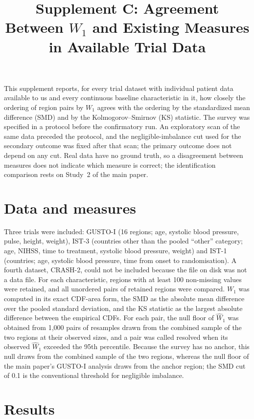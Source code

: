 \documentclass[11pt]{article}
\title{Supplement C: Agreement Between $W_1$ and Existing Measures in Available Trial Data}
\date{}
\begin{document}
\maketitle

This supplement reports, for every trial dataset with individual patient data available to us and every continuous baseline characteristic in it, how closely the ordering of region pairs by $W_1$ agrees with the ordering by the standardized mean difference (SMD) and by the Kolmogorov--Smirnov (KS) statistic. The survey was specified in a protocol before the confirmatory run. An exploratory scan of the same data preceded the protocol, and the negligible-imbalance cut used for the secondary outcome was fixed after that scan; the primary outcome does not depend on any cut. Real data have no ground truth, so a disagreement between measures does not indicate which measure is correct; the identification comparison rests on Study~2 of the main paper.

\section{Data and measures}

Three trials were included: GUSTO-I (16 regions; age, systolic blood pressure, pulse, height, weight), IST-3 (countries other than the pooled ``other'' category; age, NIHSS, time to treatment, systolic blood pressure, weight) and IST-1 (countries; age, systolic blood pressure, time from onset to randomisation). A fourth dataset, CRASH-2, could not be included because the file on disk was not a data file. For each characteristic, regions with at least 100 non-missing values were retained, and all unordered pairs of retained regions were compared. $W_1$ was computed in its exact CDF-area form, the SMD as the absolute mean difference over the pooled standard deviation,\cite{austin2011} and the KS statistic as the largest absolute difference between the empirical CDFs. For each pair, the null floor of $\widehat{W}_1$ was obtained from 1,000 pairs of resamples drawn from the combined sample of the two regions at their observed sizes, and a pair was called resolved when its observed $\widehat{W}_1$ exceeded the 95th percentile. Because the survey has no anchor, this null draws from the combined sample of the two regions, whereas the null floor of the main paper's GUSTO-I analysis draws from the anchor region; the SMD cut of 0.1 is the conventional threshold for negligible imbalance.\cite{austin2009}

\section{Results}
\end{document}
